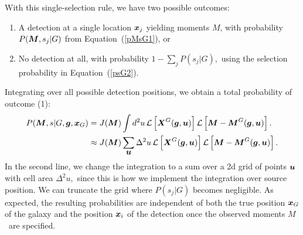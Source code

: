\documentclass[11pt,preprint,flushrt]{aastex}
\def\eqq#1{Equation~(\ref{#1})}
\newcommand{\vecX}{\mbox{\boldmath $X$}}
\newcommand{\vecg}{\mbox{\boldmath $g$}}
\newcommand{\vecM}{\mbox{\boldmath $M$}}
\newcommand{\vecx}{\mbox{\boldmath $x$}}
\newcommand{\vecu}{\mbox{\boldmath $u$}}
\newcommand{\bnab}{\boldsymbol{\nabla}}
\newcommand{\likeli}{\mbox{$\mathcal{L}$}}
\begin{document}

With this single-selection rule, we have two possible outcomes:
\begin{enumerate}
\item A detection at a single location $\vecx_j$ yielding moments \vecM,
  with probability $P(\vecM, s_j|G)$ from \eqq{pMsG1}, or
\item No detection at all, with probability $1-\sum_j P(s_j | G),$
  using the selection probability in \eqq{psG2}.
\end{enumerate}
Integrating over all possible detection positions, we obtain a total
probability of outcome (1):
\begin{align}
P(\vecM, s | G, \vecg, \vecx_G) & =  J(\vecM) \int d^2u\, \likeli\left[\vecX^G(\vecg,\vecu)\right] 
\likeli\left[\vecM-\vecM^G(\vecg,\vecu)\right]. \\
\label{pMsG2}
& \approx  J(\vecM) \sum_{\vecu} \Delta^2u\, \likeli\left[\vecX^G(\vecg,\vecu)\right] 
\likeli\left[\vecM-\vecM^G(\vecg,\vecu)\right].
\end{align}
In the second line, we change the
integration to a sum over a 2d grid of points $\vecu$ with cell area
$\Delta^2u,$ since this is how we implement the integration over
source position. We can
truncate the grid where $P(s_j|G)$ becomes negligible.  As expected,
the resulting probabilities are independent of both the true position
$\vecx_G$ of the galaxy and the position $\vecx_i$ of the detection
once the observed moments \vecM\ are specified.
\end{document}
